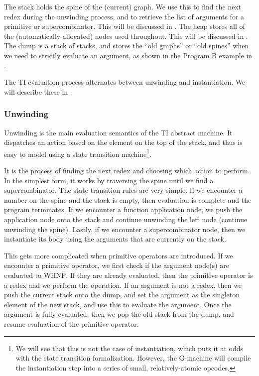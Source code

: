The stack holds the spine of the (current) graph. We use this to find the next redex during the unwinding process, and to retrieve the list of arguments for a primitive or supercombinator. This will be discussed in . The heap stores all of the (automatically-allocated) nodes used throughout. This will be discussed in . The dump is a stack of stacks, and stores the ``old graphs'' or ``old spines'' when we need to strictly evaluate an argument, as shown in the Program B example in .

The TI evaluation process alternates between unwinding and instantiation. We will describe these in .

\subsubsection{Unwinding}
\label{sec:ti-unwind}

Unwinding is the main evaluation semantics of the TI abstract machine. It dispatches an action based on the element on the top of the stack, and thus is easy to model using a state transition machine\footnote{We will see that this is not the case of instantiation, which puts it at odds with the state transition formalization. However, the G-machine will compile the instantiation step into a series of small, relatively-atomic opcodes.}.

It is the process of finding the next redex and choosing which action to perform. In the simplest form, it works by traversing the spine until we find a supercombinator. The state transition rules are very simple. If we encounter a number on the spine and the stack is empty, then evaluation is complete and the program terminates. If we encounter a function application node, we push the application node onto the stack and continue unwinding the left node (continue unwinding the spine). Lastly, if we encounter a supercombinator node, then we instantiate its body using the arguments that are currently on the stack.

This gets more complicated when primitive operators are introduced. If we encounter a primitive operator, we first check if the argument node(s) are evaluated to WHNF. If they are already evaluated, then the primitive operator is a redex and we perform the operation. If an argument is not a redex, then we push the current stack onto the dump, and set the argument as the singleton element of the new stack, and use this to evaluate the argument. Once the argument is fully-evaluated, then we pop the old stack from the dump, and resume evaluation of the primitive operator.

